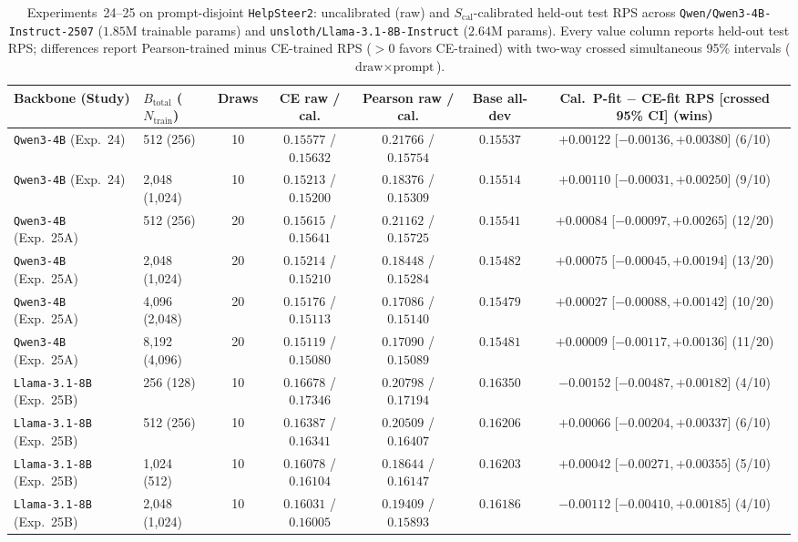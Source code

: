 \begin{table}[t]
\centering
\caption{Experiments~24--25 on prompt-disjoint \texttt{HelpSteer2}: uncalibrated (raw) and $S_{\text{cal}}$-calibrated held-out test RPS across \texttt{Qwen/Qwen3-4B-Instruct-2507} ($1.85\text{M}$ trainable params) and \texttt{unsloth/Llama-3.1-8B-Instruct} ($2.64\text{M}$ params). Every value column reports held-out test RPS; differences report Pearson-trained minus CE-trained RPS ($>0$ favors CE-trained) with two-way crossed simultaneous 95\% intervals ($\text{draw}\times\text{prompt}$).}
\label{tab:supp-helpsteer2}
\scriptsize
\setlength{\tabcolsep}{2.5pt}
\begin{tabular}{@{}llccccc@{}}
\hline
Backbone (Study) & $B_{\text{total}}$ ($N_{\text{train}}$) & Draws & CE raw / cal. & Pearson raw / cal. & Base all-dev & Cal.\ P-fit $-$ CE-fit RPS [crossed 95\% CI] (wins) \\
\hline
\texttt{Qwen3-4B} (Exp.~24) & 512 (256) & 10 & $0.15577$ / $0.15632$ & $0.21766$ / $0.15754$ & $0.15537$ & $+0.00122$ [$-0.00136, +0.00380$] (6/10) \\
\texttt{Qwen3-4B} (Exp.~24) & 2,048 (1,024) & 10 & $0.15213$ / $0.15200$ & $0.18376$ / $0.15309$ & $0.15514$ & $+0.00110$ [$-0.00031, +0.00250$] (9/10) \\
\texttt{Qwen3-4B} (Exp.~25A) & 512 (256) & 20 & $0.15615$ / $0.15641$ & $0.21162$ / $0.15725$ & $0.15541$ & $+0.00084$ [$-0.00097, +0.00265$] (12/20) \\
\texttt{Qwen3-4B} (Exp.~25A) & 2,048 (1,024) & 20 & $0.15214$ / $0.15210$ & $0.18448$ / $0.15284$ & $0.15482$ & $+0.00075$ [$-0.00045, +0.00194$] (13/20) \\
\texttt{Qwen3-4B} (Exp.~25A) & 4,096 (2,048) & 20 & $0.15176$ / $0.15113$ & $0.17086$ / $0.15140$ & $0.15479$ & $+0.00027$ [$-0.00088, +0.00142$] (10/20) \\
\texttt{Qwen3-4B} (Exp.~25A) & 8,192 (4,096) & 20 & $0.15119$ / $0.15080$ & $0.17090$ / $0.15089$ & $0.15481$ & $+0.00009$ [$-0.00117, +0.00136$] (11/20) \\
\hline
\texttt{Llama-3.1-8B} (Exp.~25B) & 256 (128) & 10 & $0.16678$ / $0.17346$ & $0.20798$ / $0.17194$ & $0.16350$ & $-0.00152$ [$-0.00487, +0.00182$] (4/10) \\
\texttt{Llama-3.1-8B} (Exp.~25B) & 512 (256) & 10 & $0.16387$ / $0.16341$ & $0.20509$ / $0.16407$ & $0.16206$ & $+0.00066$ [$-0.00204, +0.00337$] (6/10) \\
\texttt{Llama-3.1-8B} (Exp.~25B) & 1,024 (512) & 10 & $0.16078$ / $0.16104$ & $0.18644$ / $0.16147$ & $0.16203$ & $+0.00042$ [$-0.00271, +0.00355$] (5/10) \\
\texttt{Llama-3.1-8B} (Exp.~25B) & 2,048 (1,024) & 10 & $0.16031$ / $0.16005$ & $0.19409$ / $0.15893$ & $0.16186$ & $-0.00112$ [$-0.00410, +0.00185$] (4/10) \\
\hline
\end{tabular}
\end{table}

